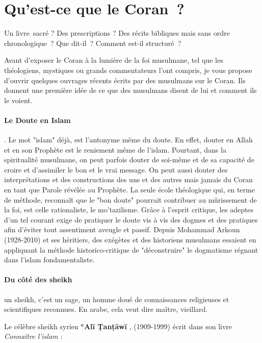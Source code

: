 \section{Qu'est-ce que le Coran~?
}

Un livre~sacré ? Des prescriptions ? Des récits bibliques mais sans
ordre chronologique~? Que dit-il~? Comment est-il structuré~?

Avant d'exposer le Coran à la lumière de la foi musulmane, tel que les
théologiens, mystiques ou grands commentateurs l'ont compris, je vous
propose d'ouvrir quelques ouvrages récents écrits par des musulmans sur
le Coran. Ils donnent une première idée de ce que des musulmans disent
de lui et comment ils le voient.

\paragraph{Le Doute en Islam}. Le mot "islam" déjà, est l'antonyme même du doute. En effet, douter en Allah et en son Prophète est le reniement même de l'islam. Pourtant, dans la spiritualité musulmane, on peut parfois douter de soi-même et de sa capacité de croire et d'assimiler le bon et le vrai message. On peut aussi douter des interprétations et des constructions des uns et des autres mais jamais du Coran en tant que Parole révélée au Prophète. 
La seule école théologique qui, en terme de méthode, reconnaît que le "bon doute" pourrait contribuer au mûrissement de la foi, est celle rationaliste, le mo'tazilisme.  Grâce à l'esprit critique, les adeptes d'un tel courant exige de pratiquer le doute vis à vis des dogmes et des pratiques afin d'éviter tout assentiment aveugle et passif. 
Depuis Mohammad Arkoun (1928-2010) et ses héritiers, des exégètes et des historiens musulmans essaient en appliquant la méthode historico-critique  de "déconstruire" le dogmatisme régnant dans l'islam fondamentaliste.

\paragraph{Du côté des sheikh}

\begin{Def}[Sheikh]
un sheikh, c'est un sage, un homme
doué de connaissances religieuses et scientifiques reconnues. En arabe,
cela veut dire maître,
vieillard.
\end{Def}
\label{un-sheik}
Le célèbre sheikh syrien \textbf{ʿAlī Ṭanṭāwī} , (1909-1999) écrit dans
son livre \emph{Connaître l'islam} :

